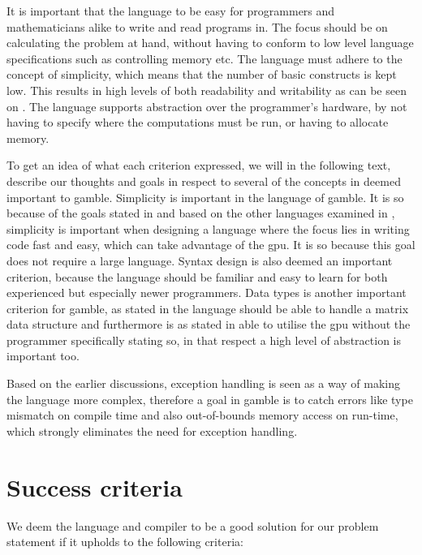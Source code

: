 It is important that the language to be easy for programmers and mathematicians alike to write and read programs in.
The focus should be on calculating the problem at hand, without having to conform to low level language specifications such as controlling memory etc.
The language must adhere to the concept of simplicity, which means that the number of basic constructs is kept low. 
This results in high levels of both readability and writability as can be seen on .
The language supports abstraction over the programmer's hardware, by not having to specify where the computations must be run, or having to allocate memory.

To get an idea of what each criterion expressed, we will in the following text, describe our thoughts and goals in respect to several of the concepts in  deemed important to \gls{gamble}.
Simplicity is important in the language of \gls{gamble}.
It is so because of the goals stated in  and based on the other languages examined in , simplicity is important when designing a language where the focus lies in writing code fast and easy, which can take advantage of the \acrshort{gpu}.
It is so because this goal does not require a large language. 
Syntax design is also deemed an important criterion, because the language should be familiar and easy to learn for both experienced but especially newer programmers.
Data types is another important criterion for \gls{gamble}, as stated in  the language should be able to handle a matrix data structure and furthermore is as stated in  able to utilise the \acrshort{gpu} without the programmer specifically stating so, in that respect a high level of abstraction is important too. 

Based on the earlier discussions, exception handling is seen as a way of making the language more complex, therefore a goal in \gls{gamble} is to catch errors like type mismatch on compile time and also out-of-bounds memory access on run-time, which strongly eliminates the need for exception handling.


\section{Success criteria}\label{sec:OurCriterias}
We deem the language and compiler to be a good solution for our problem statement if it upholds to the following criteria:

